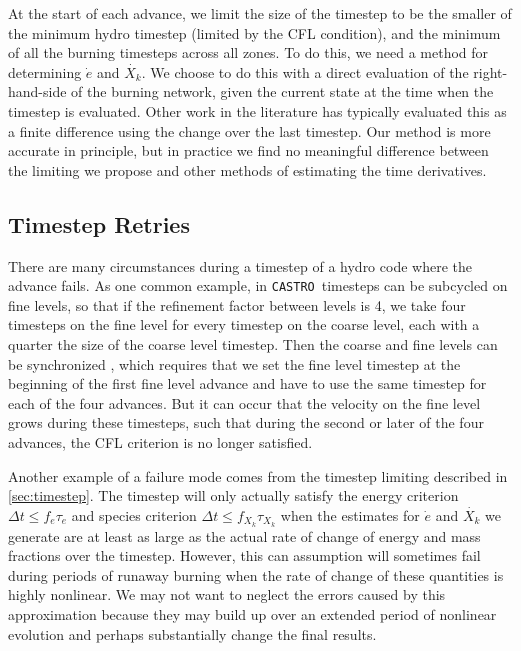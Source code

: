 \documentclass[twocolumn,numberedappendix]{../aastex62}
\newcommand{\castro}{\texttt{CASTRO}}
\begin{document}
At the start of each advance, we limit the size of the timestep to be the smaller
of the minimum hydro timestep (limited by the CFL condition), and the minimum of all the
burning timesteps across all zones. To do this, we need a method for determining 
$\dot{e}$ and $\dot{X_k}$. We choose to do this with a direct evaluation of the
right-hand-side of the burning network, given the current state at the time when
the timestep is evaluated. Other work in the literature has typically evaluated
this as a finite difference using the change over the last timestep. Our method
is more accurate in principle, but in practice we find no meaningful difference
between the limiting we propose and other methods of estimating the time derivatives.



\subsection{Timestep Retries}
\label{sec:retries}

There are many circumstances during a timestep of a hydro code where the advance
fails. As one common example, in \castro\ timesteps can be subcycled on fine levels,
so that if the refinement factor between levels is 4, we take four timesteps on
the fine level for every timestep on the coarse level, each with a quarter the
size of the coarse level timestep. Then the coarse and fine levels can be
synchronized \citep{bergercolella:1989}, which requires that we set the fine level
timestep at the beginning of the first fine level advance and have to use the same
timestep for each of the four advances. But it can occur that the velocity on the
fine level grows during these timesteps, such that during the second or later of
the four advances, the CFL criterion is no longer satisfied.

Another example of a failure mode comes from the timestep limiting described in
\ref{sec:timestep}. The timestep will only actually satisfy the energy criterion
$\Delta t \leq f_e \tau_e$ and species criterion $\Delta t \leq f_{X_k} \tau_{X_k}$
when the estimates for $\dot{e}$ and $\dot{X_k}$ we generate are at least as large
as the actual rate of change of energy and mass fractions over the timestep. However,
this can assumption will sometimes fail during periods of runaway burning when the
rate of change of these quantities is highly nonlinear. We may not want to neglect
the errors caused by this approximation because they may build up over an extended
period of nonlinear evolution and perhaps substantially change the final results.
\end{document}
